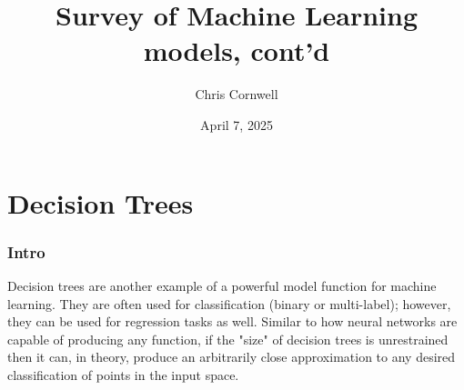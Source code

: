 \documentclass[smaller]{beamer}
\author{Chris Cornwell}
\date{April 7, 2025}
\title{Survey of Machine Learning models, cont'd}
\theoremstyle{example}
\begin{document}
\begin{frame}
\titlepage
\end{frame}

\section{Decision Trees}

\begin{frame}
\frametitle{Intro}
Decision trees are another example of a powerful model function for machine learning. They are often used for classification (binary or multi-label); however, they can be used for regression tasks as well. Similar to how neural networks are capable of producing any function, if the "size" of decision trees is unrestrained then it can, in theory, produce an arbitrarily close approximation to any desired classification of points in the input space.

\end{frame}
\end{document}
